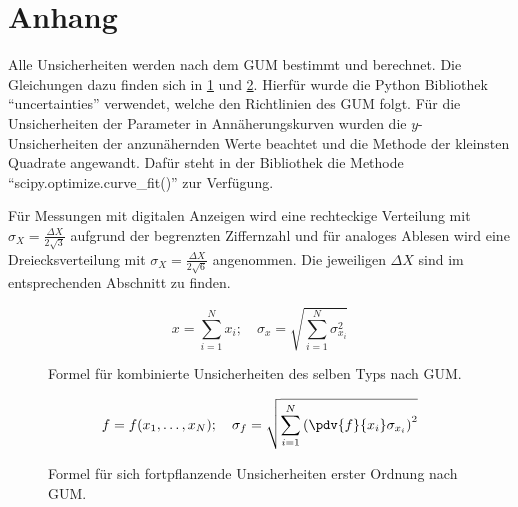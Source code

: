 \newpage
\appendix
\newpage
\section{Anhang}\label{sec:anhang}


Alle Unsicherheiten werden nach dem GUM bestimmt und berechnet.
Die Gleichungen dazu finden sich in \ref{fig:GUM_combine} und \ref{fig:GUM_formula}.
Hierfür wurde die Python Bibliothek \enquote{uncertainties} verwendet, welche den Richtlinien des GUM folgt.
Für die Unsicherheiten der Parameter in Annäherungskurven wurden die $y$-Unsicherheiten der anzunähernden Werte beachtet und die Methode der kleinsten Quadrate angewandt.
Dafür steht in der Bibliothek die Methode \enquote{scipy.optimize.curve\_fit()} zur Verfügung.

Für Messungen mit digitalen Anzeigen wird eine rechteckige Verteilung mit $\sigma_X = \frac{\Delta X}{2\sqrt{3}}$ aufgrund der begrenzten Ziffernzahl und für analoges Ablesen wird eine Dreiecksverteilung mit $\sigma_X = \frac{\Delta X}{2\sqrt{6}}$ angenommen.
Die jeweiligen $\Delta X$ sind im entsprechenden Abschnitt zu finden.

\begin{figure}[ht]
	\begin{equation*}
	x = \sum_{i=1}^{N} x_i
	;\quad
	\sigma_x = \sqrt{\sum_{i = 1}^{N} \sigma_{x_i}^2}
	\end{equation*}
	\caption{Formel für kombinierte Unsicherheiten des selben Typs nach GUM.}
	\label{fig:GUM_combine}
\end{figure}

\begin{figure}[ht]
	\begin{align*}
	f = f(x_1, \dots , x_N)
	;\quad
	\sigma_f = \sqrt{\sum_{i = 1}^{N}\left(\pdv{f}{x_i} \sigma_{x_i}\right) ^2}
	\end{align*}
	\caption{Formel für sich fortpflanzende Unsicherheiten erster Ordnung nach GUM.}
	\label{fig:GUM_formula}
\end{figure}
